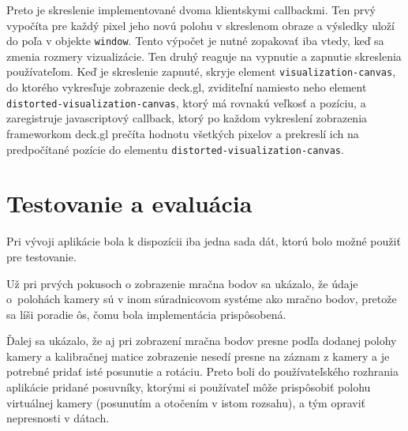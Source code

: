 Preto je skreslenie implementované dvoma klientskymi callbackmi. Ten prvý vypočíta pre každý pixel jeho novú polohu v skreslenom obraze a výsledky uloží do poľa v objekte \texttt{window}. Tento výpočet je nutné zopakovať iba vtedy, keď sa zmenia rozmery vizualizácie. Ten druhý reaguje na vypnutie a zapnutie skreslenia používateľom. Keď je skreslenie zapnuté, skryje element \texttt{visualization-canvas}, do ktorého vykresľuje zobrazenie deck.gl, zviditeľní namiesto neho element \texttt{distorted-visualization-canvas}, ktorý má rovnakú veľkosť a pozíciu, a zaregistruje javascriptový callback, ktorý po každom vykreslení zobrazenia frameworkom deck.gl prečíta hodnotu všetkých pixelov a prekreslí ich na predpočítané pozície do elementu \texttt{distorted-visualization-canvas}.

\chapter{Testovanie a evaluácia}

Pri vývoji aplikácie bola k dispozícii iba jedna sada dát, ktorú bolo možné použiť pre testovanie.

Už pri prvých pokusoch o zobrazenie mračna bodov sa ukázalo, že údaje o~polohách kamery sú v inom súradnicovom systéme ako mračno bodov, pretože sa líši poradie ôs, čomu bola implementácia prispôsobená.

Ďalej sa ukázalo, že aj pri zobrazení mračna bodov presne podľa dodanej polohy kamery a kalibračnej matice zobrazenie nesedí presne na záznam z kamery a je potrebné pridať isté posunutie a rotáciu. Preto boli do používateľského rozhrania aplikácie pridané posuvníky, ktorými si používateľ môže prispôsobiť polohu virtuálnej kamery (posunutím a otočením v istom rozsahu), a tým opraviť nepresnosti v dátach.

